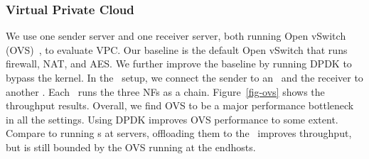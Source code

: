 \subsubsection{Virtual Private Cloud}
We use one sender server and one receiver server, both running Open vSwitch (OVS)~\cite{ovs-nsdi15}, to evaluate VPC.
Our baseline is the default Open vSwitch that runs firewall, NAT, and AES.
We further improve the baseline by running DPDK to bypass the kernel.
In the \snic\ setup, we connect the sender to an \snic\ and the receiver to another \snic.
Each \snic\ runs the three NFs as a chain.
Figure~\ref{fig-ovs} shows the throughput results.
Overall, we find OVS to be a major performance bottleneck in all the settings. Using DPDK improves OVS performance to some extent.
Compare to running \nt{}s at servers, offloading them to the \snic\ improves throughput, but is still bounded by the OVS running at the endhosts.